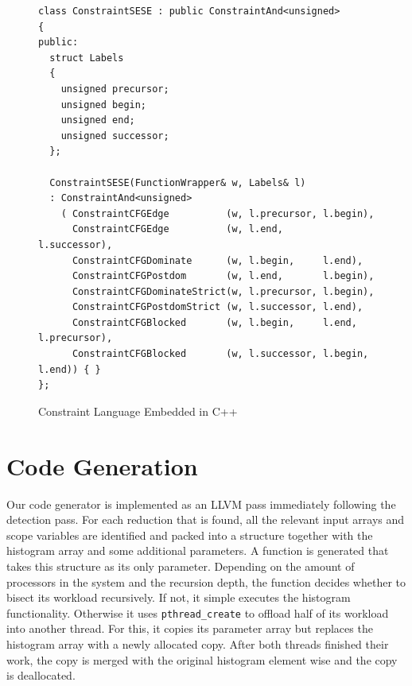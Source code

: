 \begin{figure}[ht]
\begin{lstlisting}
class ConstraintSESE : public ConstraintAnd<unsigned>
{
public:
  struct Labels
  {
    unsigned precursor;
    unsigned begin;
    unsigned end;
    unsigned successor;
  };

  ConstraintSESE(FunctionWrapper& w, Labels& l)
  : ConstraintAnd<unsigned>
    ( ConstraintCFGEdge          (w, l.precursor, l.begin),
      ConstraintCFGEdge          (w, l.end,       l.successor),
      ConstraintCFGDominate      (w, l.begin,     l.end),
      ConstraintCFGPostdom       (w, l.end,       l.begin),
      ConstraintCFGDominateStrict(w, l.precursor, l.begin),
      ConstraintCFGPostdomStrict (w, l.successor, l.end),
      ConstraintCFGBlocked       (w, l.begin,     l.end,   l.precursor),
      ConstraintCFGBlocked       (w, l.successor, l.begin, l.end)) { }
};
\end{lstlisting}
\caption{Constraint Language Embedded in C++}
\label{code-snippet}
\end{figure}

\section{Code Generation}

Our code generator is implemented as an LLVM pass immediately following 
the detection pass.
For each reduction that is found, all the relevant input
arrays and scope variables are identified and packed into a structure
together with the histogram array and some additional parameters.  A
function is generated that takes this structure as its only parameter.
Depending on the amount of processors in the system and the recursion
depth, the function decides whether to bisect its workload
recursively.  If not, it simple executes the histogram functionality.
Otherwise it uses \texttt{pthread\_create} to offload half of its
workload into another thread.  For this, it copies its parameter array
but replaces the histogram array with a newly allocated copy.  After
both threads finished their work, the copy is merged with the original
histogram element wise and the copy is deallocated.

